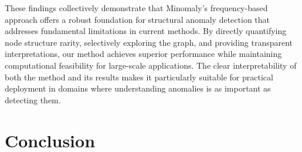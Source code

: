 \documentclass[preprint,12pt]{elsarticle}
\theoremstyle{plain}
\theoremstyle{definition}
\theoremstyle{remark}
\begin{document}
These findings collectively demonstrate that Minomaly's frequency-based approach offers a robust foundation for structural anomaly detection that addresses fundamental limitations in current methods. By directly quantifying node structure rarity, selectively exploring the graph, and providing transparent interpretations, our method achieves superior performance while maintaining computational feasibility for large-scale applications. The clear interpretability of both the method and its results makes it particularly suitable for practical deployment in domains where understanding anomalies is as important as detecting them.


\section{Conclusion}
\label{sec:conclusion}
\end{document}
